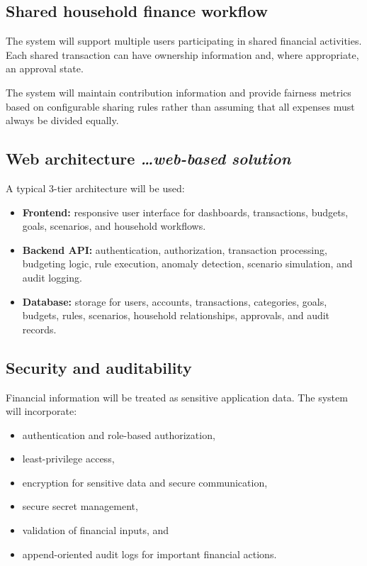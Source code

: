 \documentclass[11pt,a4paper]{article}
\newcommand{\BvrHint}[1]{%
  {\normalfont\normalsize\itshape\hfill #1}}
\begin{document}
\subsection{Shared household finance workflow}

The system will support multiple users participating in shared financial
activities. Each shared transaction can have ownership information and,
where appropriate, an approval state.

The system will maintain contribution information and provide fairness metrics
based on configurable sharing rules rather than assuming that all expenses
must always be divided equally.


\subsection{Web architecture%
  \BvrHint{\ldots web-based solution}}

A typical 3-tier architecture will be used:

\begin{itemize}[leftmargin=0.7cm]
    \item \textbf{Frontend:} responsive user interface for dashboards,
    transactions, budgets, goals, scenarios, and household workflows.
    
    \item \textbf{Backend API:} authentication, authorization, transaction
    processing, budgeting logic, rule execution, anomaly detection, scenario
    simulation, and audit logging.
    
    \item \textbf{Database:} storage for users, accounts, transactions,
    categories, goals, budgets, rules, scenarios, household relationships,
    approvals, and audit records.
\end{itemize}


\subsection{Security and auditability}

Financial information will be treated as sensitive application data. The
system will incorporate:

\begin{itemize}[leftmargin=0.7cm]
    \item authentication and role-based authorization,
    \item least-privilege access,
    \item encryption for sensitive data and secure communication,
    \item secure secret management,
    \item validation of financial inputs, and
    \item append-oriented audit logs for important financial actions.
\end{itemize}
\end{document}
